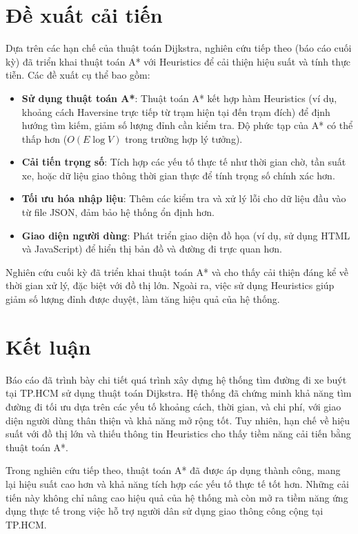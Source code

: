 \documentclass[a4paper,12pt]{article}
\begin{document}
\section{Đề xuất cải tiến}
Dựa trên các hạn chế của thuật toán Dijkstra, nghiên cứu tiếp theo (báo cáo cuối kỳ) đã triển khai thuật toán A* với Heuristics để cải thiện hiệu suất và tính thực tiễn. Các đề xuất cụ thể bao gồm:
\begin{itemize}
    \item \textbf{Sử dụng thuật toán A*}: Thuật toán A* kết hợp hàm Heuristics (ví dụ, khoảng cách Haversine trực tiếp từ trạm hiện tại đến trạm đích) để định hướng tìm kiếm, giảm số lượng đỉnh cần kiểm tra. Độ phức tạp của A* có thể thấp hơn ($O(E \log V)$ trong trường hợp lý tưởng).
    \item \textbf{Cải tiến trọng số}: Tích hợp các yếu tố thực tế như thời gian chờ, tần suất xe, hoặc dữ liệu giao thông thời gian thực để tính trọng số chính xác hơn.
    \item \textbf{Tối ưu hóa nhập liệu}: Thêm các kiểm tra và xử lý lỗi cho dữ liệu đầu vào từ file JSON, đảm bảo hệ thống ổn định hơn.
    \item \textbf{Giao diện người dùng}: Phát triển giao diện đồ họa (ví dụ, sử dụng HTML và JavaScript) để hiển thị bản đồ và đường đi trực quan hơn.
\end{itemize}
Nghiên cứu cuối kỳ đã triển khai thuật toán A* và cho thấy cải thiện đáng kể về thời gian xử lý, đặc biệt với đồ thị lớn. Ngoài ra, việc sử dụng Heuristics giúp giảm số lượng đỉnh được duyệt, làm tăng hiệu quả của hệ thống.

\section{Kết luận}
Báo cáo đã trình bày chi tiết quá trình xây dựng hệ thống tìm đường đi xe buýt tại TP.HCM sử dụng thuật toán Dijkstra. Hệ thống đã chứng minh khả năng tìm đường đi tối ưu dựa trên các yếu tố khoảng cách, thời gian, và chi phí, với giao diện người dùng thân thiện và khả năng mở rộng tốt. Tuy nhiên, hạn chế về hiệu suất với đồ thị lớn và thiếu thông tin Heuristics cho thấy tiềm năng cải tiến bằng thuật toán A*.

Trong nghiên cứu tiếp theo, thuật toán A* đã được áp dụng thành công, mang lại hiệu suất cao hơn và khả năng tích hợp các yếu tố thực tế tốt hơn. Những cải tiến này không chỉ nâng cao hiệu quả của hệ thống mà còn mở ra tiềm năng ứng dụng thực tế trong việc hỗ trợ người dân sử dụng giao thông công cộng tại TP.HCM.
\end{document}
